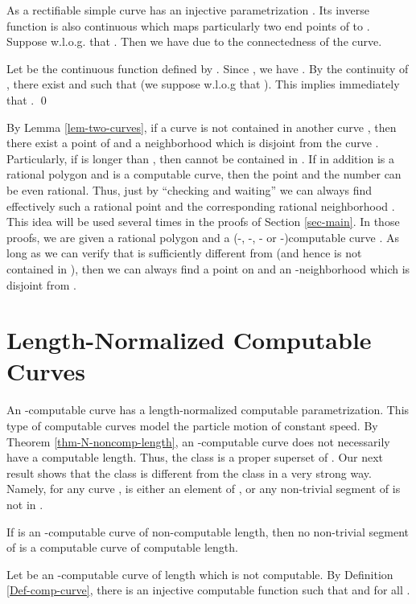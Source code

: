 \documentclass{LMCS}
\theoremstyle{plain}
\begin{document}
As a rectifiable simple curve  has an injective parametrization . Its inverse function  is also continuous which maps particularly two end points of  to . Suppose w.l.o.g. that . Then we have  due to the connectedness of the curve.

Let  be the continuous function defined by . Since , we have . By the continuity of , there exist   and  such that  (we suppose w.l.o.g that ). This implies immediately that .
\qed

By Lemma \ref{lem-two-curves}, if a curve  is not contained in another curve , then there exist a point  of  and a neighborhood  which is disjoint from the curve . Particularly, if  is longer than , then  cannot be contained in . If in addition  is a rational polygon and  is a computable curve, then the point  and the number  can be even rational. Thus, just by ``checking and waiting'' we can always find effectively such a rational point  and the corresponding rational neighborhood . This idea will be used several times in the proofs of Section \ref{sec-main}. In those proofs, we are given a rational polygon  and a (-, -, - or -)computable curve . As long as we can verify that  is sufficiently different from  (and hence  is not contained in ), then we can always find a point  on  and an -neighborhood  which is disjoint from .



\section{Length-Normalized Computable Curves}\label{sec-n-comp-curve}

An -computable curve has a length-normalized computable parametrization. This type of computable curves model the particle motion of constant speed. By Theorem \ref{thm-N-noncomp-length}, an -computable curve does not necessarily have a computable length. Thus, the class  is a proper superset of . Our next result shows that the class  is different from the class  in a very strong way. Namely, for any curve ,  is either an element of , or any non-trivial segment of  is not in .

\begin{lem}\label{lem-N-C-no-containing}
If  is an -computable curve of non-computable length, then no non-trivial segment of  is a computable curve of computable length.
\end{lem}
\proof
Let  be an -computable curve of length  which is not computable. By Definition \ref{Def-comp-curve}, there is an injective computable function  such that  and  for all .
\end{document}

